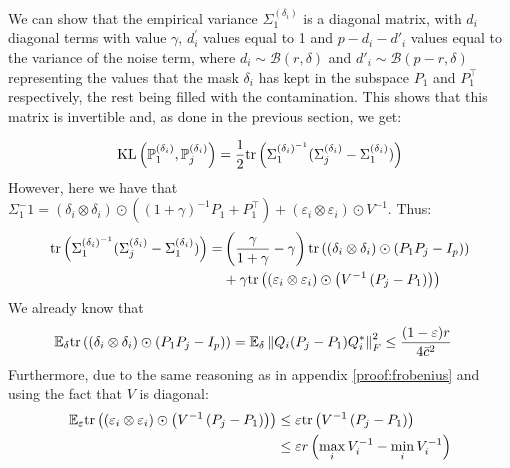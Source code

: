 \documentclass{article}
\numberwithin{equation}{section}
\numberwithin{equation}{section}
\begin{document}
            We can show that the empirical variance $\Sigma_1^{(\delta_i)}$ is a diagonal matrix, with $d_i$ diagonal terms with value $\gamma$, $d^\prime_i$ values equal to 1 and $p-d_i-d'_i$ values equal to the variance of the noise term, where $d_i \sim \mathcal{B}(r, \delta)$ and $d'_i \sim \mathcal{B}(p-r, \delta)$ representing the values that the mask $\delta_i$ has kept in the subspace $P_1$ and $P_1^\top$ respectively, the rest being filled with the contamination. This shows that this matrix is invertible and, as done in the previous section, we get:
            
            \begin{equation}
                    \text{KL}\left( \mathbb{P}_1^{(\delta_i)}, \mathbb{P}_j^{(\delta_i)}\right) =  \frac{1}{2} \text{tr}\left(\Sigma_1^{(\delta_i)^{-1}} (\Sigma_j^{(\delta_i)} - \Sigma_1^{(\delta_i)})\right)
            \end{equation}
            However, here we have that $\Sigma_1^-1 = (\delta_i \otimes \delta_i) \odot\left((1+\gamma)^{-1}P_1 + P_1^\top\right) + (\varepsilon_i \otimes \varepsilon_i)\odot V^{-1}$. Thus:
            \begin{equation}
                \begin{split}
                \text{tr}\left(\Sigma_1^{(\delta_i)^{-1}} (\Sigma_j^{(\delta_i)} - \Sigma_1^{(\delta_i)})\right) = & \left(\frac{\gamma}{1+\gamma} - \gamma\right)\text{tr}\left((\delta_i \otimes \delta_i) \odot \left(P_1P_j - I_p\right)\right)\\
                & + \gamma\text{tr}\left((\varepsilon_i \otimes \varepsilon_i) \odot \left(V^{-1}\left(P_j - P_1\right)\right) \right)
                \end{split}
            \end{equation}
            We already know that
            \begin{equation}
                \begin{split}
                \mathbb{E}_\delta\text{tr}\left((\delta_i \otimes \delta_i) \odot \left(P_1P_j - I_p\right)\right) & = \mathbb{E}_\delta \left\Vert Q_i(P_j - P_1)Q_i^* \right\Vert_F^2 \leq \frac{(1 - \varepsilon) r}{4\bar{c}^2}
            \end{split}
            \end{equation}
            Furthermore, due to the same reasoning as in appendix \ref{proof:frobenius} and using the fact that $V$ is diagonal:
            \begin{equation}
                \begin{split}
                \mathbb{E}_\varepsilon \text{tr}\left((\varepsilon_i \otimes \varepsilon_i) \odot \left(V^{-1}\left(P_j - P_1\right)\right)\right) & \leq \varepsilon \text{tr}\left(V^{-1} \left( P_j - P_1 \right)\right)\\
                & \leq \varepsilon r \left(\max_i{V^{-1}_i} - \min_i{V^{-1}_i} \right)
                \end{split}
            \end{equation}
\end{document}
